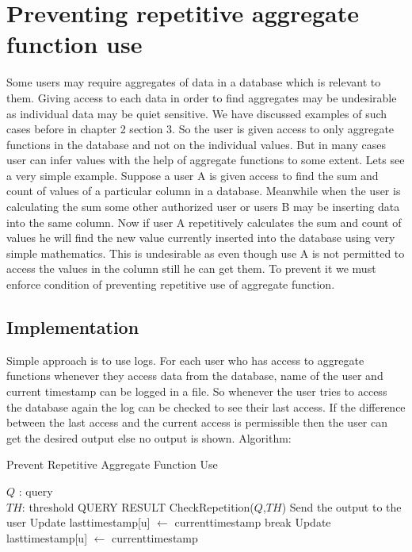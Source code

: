 \documentclass[11pt,a4paper]{report}
\begin{document}
\section{Preventing repetitive aggregate function use}
Some users may require aggregates of data in a database which is relevant to them. Giving access to each data in order to find aggregates may be undesirable as individual data may be quiet sensitive. We have discussed examples of such cases before in chapter 2 section 3. So the user is given access to only aggregate functions in the database and not on the individual values. But in many cases user can infer values  with the help of aggregate functions to some extent. Lets see a very simple example. Suppose a user A is given access to find the sum and count of values of a particular column in a database. Meanwhile when the user is calculating the sum some other authorized user or users B may be inserting data into the same column. Now if user A repetitively calculates the sum and count of values he will find the new value currently inserted into the database using very simple mathematics. This is undesirable as even though use A is not permitted to access the values in the column still he can get them. To prevent it we must enforce condition of preventing repetitive use of aggregate function. 
\subsection{Implementation} 
Simple approach is to use logs. For each user who has access to aggregate functions whenever they access data from the database, name of the user and current timestamp can be logged in a file. So whenever the user tries to access the database again the log can be checked to see their last access. If the difference between the last access and the current access is permissible then the user can get the desired output else no output is shown.
Algorithm: 
\begin{algorithm}[H]
\caption{Prevent Repetitive Aggregate Function Use}
\renewcommand{\algorithmicrequire}{\textbf{Inputs:}}
\begin{algorithmic}[1]
\REQUIRE $Q$ : query\\ $TH$:  threshold
\ENSURE QUERY RESULT
\STATE Check\textunderscore Repetition($Q$,$TH$)
 \STATE Send the output to the user
 \STATE Update last\textunderscore timestamp[u] $\leftarrow$ current\textunderscore timestamp
 break
 \ELSE 
 \STATE Update last\textunderscore timestamp[u]  $\leftarrow$ current\textunderscore timestamp
 \ENDIF
 \ENDIF
 \ENDFOR
\end{algorithmic}
\end{algorithm}
\end{document}
